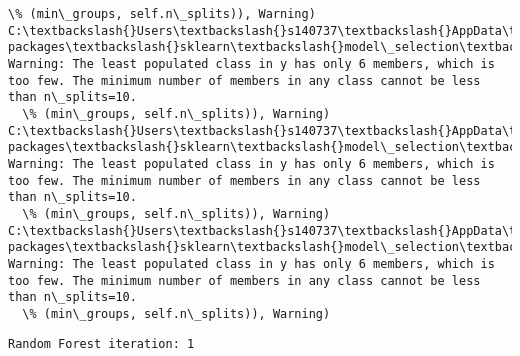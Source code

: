 \documentclass[11pt]{article}
\begin{document}
\begin{Verbatim}[commandchars=\\\{\}]
  \% (min\_groups, self.n\_splits)), Warning)
C:\textbackslash{}Users\textbackslash{}s140737\textbackslash{}AppData\textbackslash{}Local\textbackslash{}Continuum\textbackslash{}anaconda3\textbackslash{}lib\textbackslash{}site-packages\textbackslash{}sklearn\textbackslash{}model\_selection\textbackslash{}\_split.py:605: Warning: The least populated class in y has only 6 members, which is too few. The minimum number of members in any class cannot be less than n\_splits=10.
  \% (min\_groups, self.n\_splits)), Warning)
C:\textbackslash{}Users\textbackslash{}s140737\textbackslash{}AppData\textbackslash{}Local\textbackslash{}Continuum\textbackslash{}anaconda3\textbackslash{}lib\textbackslash{}site-packages\textbackslash{}sklearn\textbackslash{}model\_selection\textbackslash{}\_split.py:605: Warning: The least populated class in y has only 6 members, which is too few. The minimum number of members in any class cannot be less than n\_splits=10.
  \% (min\_groups, self.n\_splits)), Warning)
C:\textbackslash{}Users\textbackslash{}s140737\textbackslash{}AppData\textbackslash{}Local\textbackslash{}Continuum\textbackslash{}anaconda3\textbackslash{}lib\textbackslash{}site-packages\textbackslash{}sklearn\textbackslash{}model\_selection\textbackslash{}\_split.py:605: Warning: The least populated class in y has only 6 members, which is too few. The minimum number of members in any class cannot be less than n\_splits=10.
  \% (min\_groups, self.n\_splits)), Warning)

    \end{Verbatim}

    \begin{Verbatim}[commandchars=\\\{\}]
Random Forest iteration: 1 

    \end{Verbatim}
\end{document}
